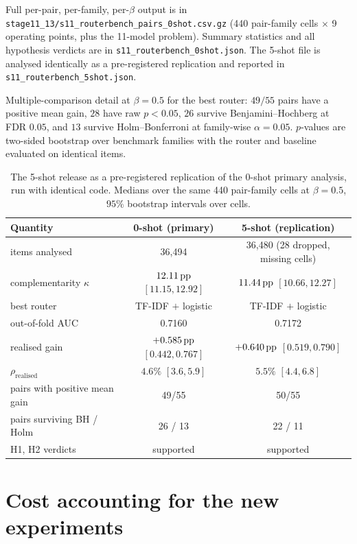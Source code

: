 Full per-pair, per-family, per-$\beta$ output is in
\texttt{stage11\_13/s11\_routerbench\_pairs\_0shot.csv.gz} (440 pair-family cells
$\times$ 9 operating points, plus the 11-model problem). Summary statistics and
all hypothesis verdicts are in \texttt{s11\_routerbench\_0shot.json}. The 5-shot
file is analysed identically as a pre-registered replication and reported in
\texttt{s11\_routerbench\_5shot.json}.

Multiple-comparison detail at $\beta=0.5$ for the best router: $49/55$ pairs
have a positive mean gain, $28$ have raw $p<0.05$, $26$ survive
Benjamini--Hochberg at FDR $0.05$, and $13$ survive Holm--Bonferroni at
family-wise $\alpha=0.05$. $p$-values are two-sided bootstrap over benchmark
families with the router and baseline evaluated on identical items.

\begin{table}[h]\centering\small
\caption{The 5-shot release as a pre-registered replication of the 0-shot
primary analysis, run with identical code. Medians over the same 440
pair-family cells at $\beta=0.5$, $95\%$ bootstrap intervals over cells.}
\begin{tabular}{lcc}
\toprule
Quantity & 0-shot (primary) & 5-shot (replication) \\
\midrule
items analysed                    & 36{,}494 & 36{,}480 (28 dropped, missing cells) \\
complementarity $\kappa$          & $12.11\,\text{pp}$ $[11.15,12.92]$ & $11.44\,\text{pp}$ $[10.66,12.27]$ \\
best router                       & TF-IDF $+$ logistic & TF-IDF $+$ logistic \\
\quad out-of-fold AUC             & 0.7160 & 0.7172 \\
\quad realised gain               & $+0.585\,\text{pp}$ $[0.442,0.767]$ & $+0.640\,\text{pp}$ $[0.519,0.790]$ \\
\quad $\rho_{\text{realised}}$    & $4.6\%$ $[3.6,5.9]$ & $5.5\%$ $[4.4,6.8]$ \\
pairs with positive mean gain     & 49/55 & 50/55 \\
pairs surviving BH / Holm         & 26 / 13 & 22 / 11 \\
H1, H2 verdicts                   & supported & supported \\
\bottomrule
\end{tabular}
\end{table}

\section{Cost accounting for the new experiments}\label{app:cost}

